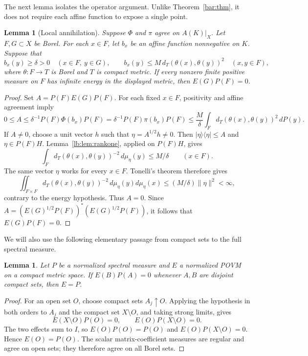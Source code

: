 \documentclass[11pt,letterpaper]{amsart}
\newtheorem{lemma}[theorem]{Lemma}
\theoremstyle{definition}
\theoremstyle{remark}
\numberwithin{equation}{section}
\begin{document}
The next lemma isolates the operator argument. Unlike
Theorem~\ref{bar:thm}, it does not require each affine function
to expose a single point.

\begin{lemma}[Local annihilation]\label{paper:pos:localization}
Suppose $\Phi$ and $\pi$ agree on $A(K)|_X$. Let
$F,G\subset X$ be Borel. For each $x\in F$, let $b_x$ be
an affine function nonnegative on $K$. Suppose that
\[
 b_x(y)\ge\delta>0\quad(x\in F,\ y\in G),
 \qquad
 b_x(y)\le M\,d_T(\theta(x),\theta(y))^2
       \quad(x,y\in F),
\]
where $\theta:F\to T$ is Borel and $T$ is compact metric.
If every nonzero finite positive measure on $F$ has infinite
energy in the displayed metric, then $E(G)P(F)=0$.
\end{lemma}
\begin{proof}
Set $A=P(F)E(G)P(F)$. For each fixed $x\in F$, positivity
and affine agreement imply
\[
 0\le A
 \le\delta^{-1}P(F)\Phi(b_x)P(F)
 =\delta^{-1}P(F)\pi(b_x)P(F)
 \le\frac M\delta\int_F
           d_T(\theta(x),\theta(y))^2\,dP(y).
\]
If $A\ne0$, choose a unit vector $h$ such that
$\eta=A^{1/2}h\ne0$. Then
$|\eta\rangle\langle\eta|\le A$ and $\eta\in P(F)H$.
Lemma~\ref{lb:lem:rankone}, applied on $P(F)H$, gives
\[
 \int_Fd_T(\theta(x),\theta(y))^{-2}\,d\mu_\eta(y)
 \le M/\delta\qquad(x\in F).
\]
The same vector $\eta$ works for every $x\in F$. Tonelli's theorem
therefore gives
\[
 \iint_{F\times F}d_T(\theta(x),\theta(y))^{-2}
       \,d\mu_\eta(y)d\mu_\eta(x)
 \le (M/\delta)\|\eta\|^2<\infty,
\]
contrary to the energy hypothesis. Thus $A=0$.
Since $A=(E(G)^{1/2}P(F))^*(E(G)^{1/2}P(F))$, it follows that
$E(G)P(F)=0$.
\end{proof}

We will also use the following elementary passage from compact
sets to the full spectral measure.

\begin{lemma}\label{paper:pos:measure-identification}
Let $P$ be a normalized spectral measure and $E$ a normalized POVM
on a compact metric space. If $E(B)P(A)=0$ whenever $A,B$ are
disjoint compact sets, then $E=P$.
\end{lemma}
\begin{proof}
For an open set $O$, choose compact sets $A_j\uparrow O$.
Applying the hypothesis in both orders to $A_j$ and the
compact set $X\setminus O$, and taking strong limits, gives
\[
 E(X\setminus O)P(O)=0,\qquad
 E(O)P(X\setminus O)=0.
\]
The two effects sum to $I$, so $E(O)P(O)=P(O)$ and
$E(O)P(X\setminus O)=0$. Hence $E(O)=P(O)$.
The scalar matrix-coefficient measures are regular and agree
on open sets; they therefore agree on all Borel sets.
\end{proof}
\end{document}
